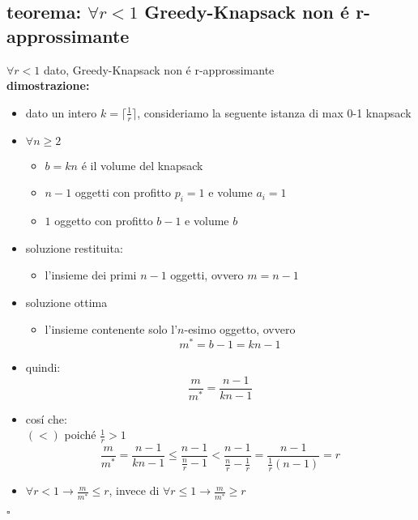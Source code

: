 
\subsection*{teorema: $\forall r<1$ Greedy-Knapsack non \'e r-approssimante}
\begin{flushleft}
	$\forall r<1$ dato, Greedy-Knapsack non \'e r-approssimante \newline \\
	\textbf{dimostrazione:}
	\begin{itemize}
		\item dato un intero $k=\lceil\frac{1}{r}\rceil$, consideriamo la seguente istanza di max 0-1 knapsack
		\item $\forall n\geq 2$
		\begin{itemize}
			\item $b=kn$ \'e il volume del knapsack
			\item $n-1$ oggetti con profitto $p_i=1$ e volume $a_i=1$
			\item $1$ oggetto con profitto $b-1$ e volume $b$
		\end{itemize}
		\item soluzione restituita:
		\begin{itemize}
			\item l'insieme dei primi $n-1$ oggetti, ovvero $m=n-1$
		\end{itemize}
		\item soluzione ottima
		\begin{itemize}
			\item l'insieme contenente solo l'$n$-esimo oggetto, ovvero $$m^*=b-1=kn-1$$
		\end{itemize}
		\vspace{0.5cm}
		\item quindi: $$\frac{m}{m^*}=\frac{n-1}{kn-1}$$
		\item cos\'i che: \newline \\
			\hspace{8cm}$(<)$ poich\'e $\frac{1}{r}>1$
			$$\frac{m}{m^*}=\frac{n-1}{kn-1}\leq\frac{n-1}{\frac{n}{r}-1}<\frac{n-1}{\frac{n}{r}-\frac{1}{r}}=\frac{n-1}{\frac{1}{r}(n-1)}=r$$
		\item \color{gray} $\forall r<1\rightarrow\frac{m}{m^*}\leq r$, invece di $\forall r\leq 1\rightarrow\frac{m}{m^*}\geq r$
	\end{itemize}
	\hfill$\square$
\end{flushleft}

